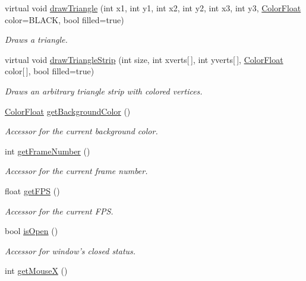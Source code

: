 \begin{DoxyCompactItemize}
virtual void \hyperlink{classtsgl_1_1_canvas_a8abc9ed7d3c55c5d701009040c65000e}{draw\-Triangle} (int x1, int y1, int x2, int y2, int x3, int y3, \hyperlink{structtsgl_1_1_color_float}{\-Color\-Float} color=\-B\-L\-A\-C\-K, bool filled=true)
\begin{DoxyCompactList}\small\item\em \-Draws a triangle. \end{DoxyCompactList}\item 
virtual void \hyperlink{classtsgl_1_1_canvas_a8f570c258a8900178190ec15ac074a57}{draw\-Triangle\-Strip} (int size, int xverts\mbox{[}$\,$\mbox{]}, int yverts\mbox{[}$\,$\mbox{]}, \hyperlink{structtsgl_1_1_color_float}{\-Color\-Float} color\mbox{[}$\,$\mbox{]}, bool filled=true)
\begin{DoxyCompactList}\small\item\em \-Draws an arbitrary triangle strip with colored vertices. \end{DoxyCompactList}\item 
\hyperlink{structtsgl_1_1_color_float}{\-Color\-Float} \hyperlink{classtsgl_1_1_canvas_a2b39e50888d61e88527a66ac0f6ac880}{get\-Background\-Color} ()
\begin{DoxyCompactList}\small\item\em \-Accessor for the current background color. \end{DoxyCompactList}\item 
int \hyperlink{classtsgl_1_1_canvas_af4f8f2b1abd27316a4a39ae097407d37}{get\-Frame\-Number} ()
\begin{DoxyCompactList}\small\item\em \-Accessor for the current frame number. \end{DoxyCompactList}\item 
float \hyperlink{classtsgl_1_1_canvas_a1c8ac321138948650a3006f325dfb886}{get\-F\-P\-S} ()
\begin{DoxyCompactList}\small\item\em \-Accessor for the current \-F\-P\-S. \end{DoxyCompactList}\item 
bool \hyperlink{classtsgl_1_1_canvas_ada31408e9a96ecb1639f552d8f0de475}{is\-Open} ()
\begin{DoxyCompactList}\small\item\em \-Accessor for window's closed status. \end{DoxyCompactList}\item 
int \hyperlink{classtsgl_1_1_canvas_a4af9bed83746f998474039185d2a765a}{get\-Mouse\-X} ()

\end{DoxyCompactItemize}
